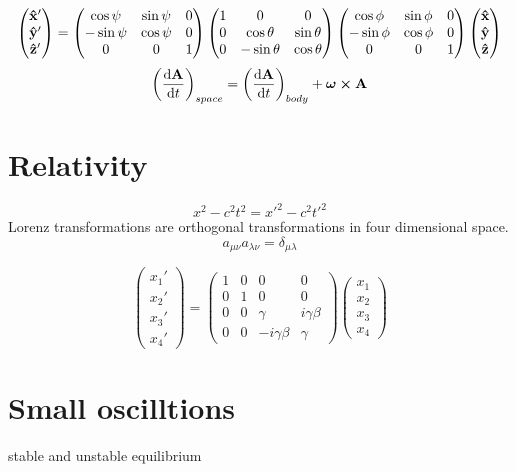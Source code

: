 \documentclass[12pt]{article}
\begin{document}
\[
\begin{pmatrix}
\vu{x}'\\ \vu{y}'\\ \vu{z}'
\end{pmatrix}
=
\begin{pmatrix}
\cos\psi& \sin\psi& 0 \\
-\sin\psi& \cos\psi& 0 \\
0& 0& 1
\end{pmatrix}
\begin{pmatrix}
1& 0& 0 \\
0& \cos\theta& \sin\theta\\
0& -\sin\theta& \cos\theta
\end{pmatrix}
\begin{pmatrix}
\cos\phi& \sin\phi& 0\\
-\sin\phi& \cos\phi& 0\\
0& 0& 1
\end{pmatrix}
\begin{pmatrix}
\vu{x}\\ \vu{y}\\ \vu{z}
\end{pmatrix}
\]
\[\qty(\dv{\vb{A}}{t})_{space}=\qty(\dv{\vb{A}}{t})_{body}+\bm{\omega}\cp\vb{A}\]


\section*{Relativity}

\[x^2-c^2t^2=x'^2-c^2t'^2\]
Lorenz transformations are orthogonal transformations in four dimensional space.
\[a_{\mu\nu}a_{\lambda\nu}=\delta_{\mu\lambda}\]

\[
\begin{pmatrix}
x_1'\\ x_2'\\ x_3'\\ x_4'
\end{pmatrix}
=
\begin{pmatrix}
1& 0& 0& 0\\ 0& 1& 0& 0\\ 0& 0& \gamma& i\gamma\beta\\ 0& 0& -i\gamma\beta& \gamma
\end{pmatrix}
\begin{pmatrix}
x_1\\ x_2\\ x_3\\ x_4
\end{pmatrix}
\]

\section*{Small oscilltions}
stable and unstable equilibrium
\end{document}
